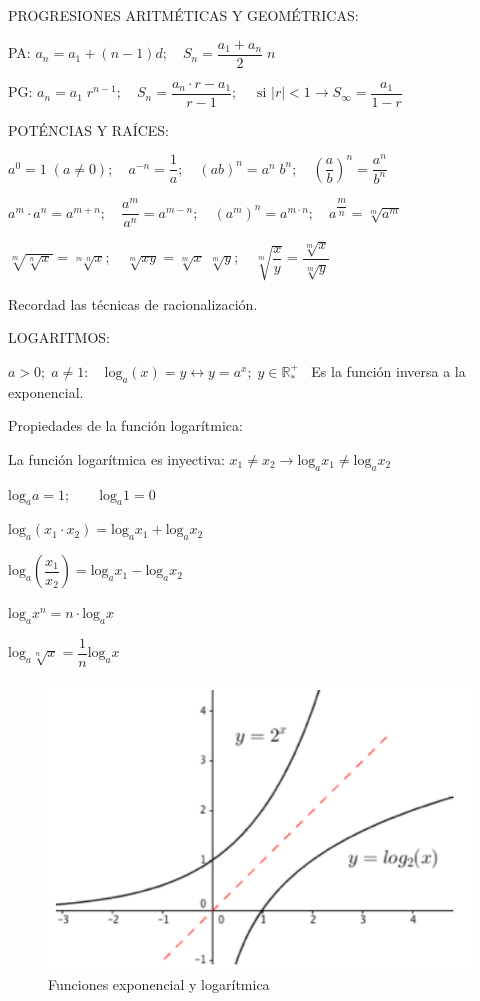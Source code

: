 PROGRESIONES ARITMÉTICAS Y GEOMÉTRICAS:

PA: $a_n=a_1+(n-1)d; \quad S_n=\dfrac {a_1+a_n}{2}\; n$

PG: $a_n=a_1 \; r^{n-1}; \quad S_n=\dfrac{a_n\cdot r-a_1}{r-1 }; \quad \mbox{ si } |r|<1 \to S_{\infty}=\dfrac {a_1}{1-r}$

POTÉNCIAS Y RAÍCES:

$a^0=1 \; (a\neq 0); \quad  a^{-n}=\dfrac {1}{a}; \quad  (ab)^n=a^n\; b^n; \quad \left( \dfrac {a}{b} \right)^n=\dfrac {a^n}{b^n}$

$a^m\cdot a^n=a^{m+n}; \quad \dfrac {a^m}{a^n}=a^{m-n}; \quad (a^m)^n=a^{m\cdot n}; \quad a^{\dfrac m n}= \sqrt[m]{a^m}$

$\sqrt[m]{\sqrt[n]{x}}=\sqrt[m\cdot n]{x}; \quad \sqrt[m]{xy}=\sqrt[m]{x}\;\sqrt[m]{y}; \quad \sqrt[m]{\dfrac {x}{y}}=\dfrac {\sqrt[m]{x}}  {\sqrt[m]{y}}$

Recordad las técnicas de racionalización.

LOGARITMOS:

$a>0; \; a\neq 1: \quad \mathrm{log}_a (x)=y \leftrightarrow y=a^x; \; y\in\mathbb{R^+_*}\; \; $ Es la función inversa a la exponencial.

Propiedades de la función logarítmica:

La función logarítmica es inyectiva: $x_1\neq x_2 \to \mathrm{log}_a x_1 \neq \mathrm{log}_a x_2$
\begin{multicols}{2}

$\mathrm{log}_a a=1; \qquad \mathrm{log}_a 1=0$

$\mathrm{log}_a (x_1\cdot x_2)=\mathrm{log}_a x_1+\mathrm{log}_a x_2$

$\mathrm{log}_a \left( \dfrac {x_1}{x_2} \right)=  {\mathrm{log}_a x_1}-{\mathrm{log}_a x_2} $

$\mathrm{log}_a x^n=n\cdot \mathrm{log}_a x$

$\mathrm{log}_a \sqrt[n]{x}= \dfrac 1 n \mathrm{log}_a x$


	\begin{figure}[H]
		\centering
		\includegraphics[width=.3\textwidth]{imagenes/apendices/APENDICESIM02.png}
		\caption {Funciones exponencial y logarítmica}
	\end{figure}
\end{multicols}

